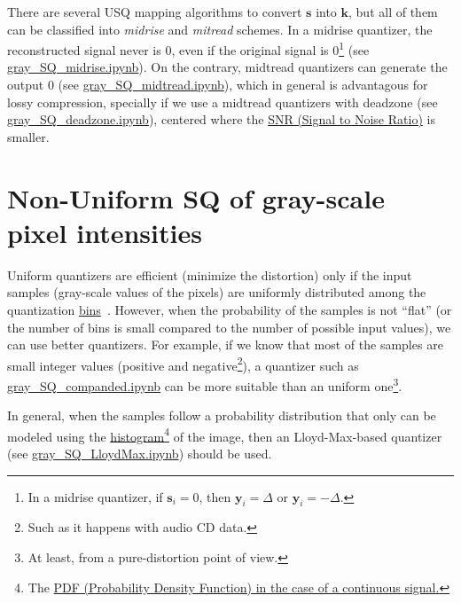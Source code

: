 There are several USQ mapping algorithms to convert $\mathbf{s}$ into
$\mathbf{k}$, but all of them can be classified into \emph{midrise}
and \emph{mitread} schemes. In a midrise quantizer, the reconstructed
signal never is 0, even if the original signal is 0\footnote{In a
midrise quantizer, if $\mathbf{s}_i=0$, then $\mathbf{y}_i=\Delta$ or
$\mathbf{y}_i=-\Delta$.} (see
\href{https://github.com/Sistemas-Multimedia/Sistemas-Multimedia.github.io/blob/master/contents/gray_SQ/gray_SQ_midrise.ipynb}{gray\_SQ\_midrise.ipynb}). On
the contrary, midtread quantizers can generate the output 0 (see
\href{https://github.com/Sistemas-Multimedia/Sistemas-Multimedia.github.io/blob/master/contents/gray_SQ/gray_SQ_midtread.ipynb}{gray\_SQ\_midtread.ipynb}),
which in general is advantagous for lossy compression, specially if we
use a midtread quantizers with deadzone (see
\href{https://github.com/Sistemas-Multimedia/Sistemas-Multimedia.github.io/blob/master/contents/gray_SQ/gray_SQ_deadzone.ipynb}{gray\_SQ\_deadzone.ipynb}),
centered where the
\href{https://en.wikipedia.org/wiki/Signal-to-noise_ratio}{SNR (Signal
  to Noise Ratio)} is smaller.

\section{Non-Uniform SQ of gray-scale pixel intensities}
Uniform quantizers are efficient (minimize the distortion) only if the
input samples (gray-scale values of the pixels) are uniformly
distributed among the quantization
\href{https://en.wikipedia.org/wiki/Data_binning}{bins}~\cite{vruiz__scalar_quantization}. However,
when the probability of the samples is not ``flat'' (or the number of
bins is small compared to the number of possible input values), we can
use better quantizers. For example, if we know that most of the
samples are small integer values (positive and negative\footnote{Such
as it happens with audio CD data.}), a quantizer such as
\href{https://github.com/Sistemas-Multimedia/Sistemas-Multimedia.github.io/blob/master/contents/gray_SQ/gray_SQ_companded.ipynb}{gray\_SQ\_companded.ipynb}
can be more suitable than an uniform one\footnote{At least, from a
pure-distortion point of view.}.

In general, when the samples follow a probability distribution that
only can be modeled using the
\href{https://en.wikipedia.org/wiki/Histogram}{histogram}\footnote{The
\href{https://en.wikipedia.org/wiki/Probability_density_function}{PDF
  (Probability Density Function) in the case of a continuous signal.}}
of the image, then an Lloyd-Max-based quantizer (see
\href{https://github.com/Sistemas-Multimedia/Sistemas-Multimedia.github.io/blob/master/contents/gray_SQ/gray_SQ_LloydMax.ipynb}{gray\_SQ\_LloydMax.ipynb}) should be used.

